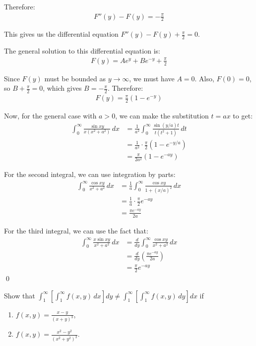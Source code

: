 Therefore:
\begin{align*}
F''(y) - F(y) = -\frac{\pi}{2}
\end{align*}

This gives us the differential equation $F''(y) - F(y) + \frac{\pi}{2} = 0$.

The general solution to this differential equation is:
\begin{align*}
F(y) = A e^y + B e^{-y} + \frac{\pi}{2}
\end{align*}

Since $F(y)$ must be bounded as $y \to \infty$, we must have $A = 0$. Also, $F(0) = 0$, so $B + \frac{\pi}{2} = 0$, which gives $B = -\frac{\pi}{2}$. Therefore:
\begin{align*}
F(y) = \frac{\pi}{2} (1 - e^{-y})
\end{align*}

Now, for the general case with $a > 0$, we can make the substitution $t = ax$ to get:
\begin{align*}
\int_{0}^{\infty} \frac{\sin xy}{x(x^2 + a^2)} \, dx &= \frac{1}{a^2} \int_{0}^{\infty} \frac{\sin (y/a)t}{t(t^2 + 1)} \, dt \\
&= \frac{1}{a^2} \cdot \frac{\pi}{2} (1 - e^{-y/a}) \\
&= \frac{\pi}{2a^2} (1 - e^{-ay})
\end{align*}

For the second integral, we can use integration by parts:
\begin{align*}
\int_{0}^{\infty} \frac{\cos xy}{x^2 + a^2} \, dx &= \frac{1}{a} \int_{0}^{\infty} \frac{\cos xy}{1 + (x/a)^2} \, dx \\
&= \frac{1}{a} \cdot \frac{\pi}{2} e^{-ay} \\
&= \frac{\pi e^{-ay}}{2a}
\end{align*}

For the third integral, we can use the fact that:
\begin{align*}
\int_{0}^{\infty} \frac{x \sin xy}{x^2 + a^2} \, dx &= \frac{d}{dy} \int_{0}^{\infty} \frac{\cos xy}{x^2 + a^2} \, dx \\
&= \frac{d}{dy} \left(\frac{\pi e^{-ay}}{2a}\right) \\
&= \frac{\pi}{2} e^{-ay}
\end{align*}\qed


\begin{problembox}
Show that $\int_{1}^{\infty} \left[ \int_{1}^{\infty} f(x, y) \, dx \right] dy \neq \int_{1}^{\infty} \left[ \int_{1}^{\infty} f(x, y) \, dy \right] dx$ if
\begin{enumerate}[label=(\alph*)]
\item $f(x, y) = \frac{x - y}{(x + y)^3}$,
\item $f(x, y) = \frac{x^2 - y^2}{(x^2 + y^2)^2}.$
\end{enumerate}
\end{problembox}

